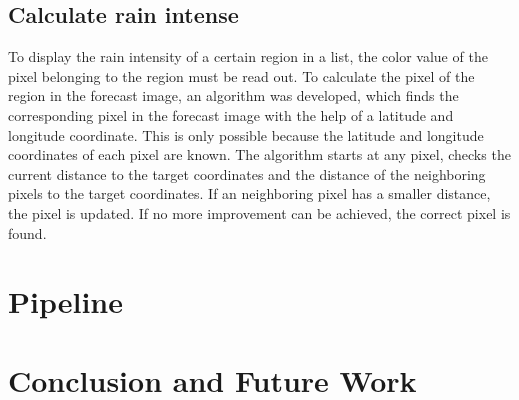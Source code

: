 \documentclass[oneside]{htwg-report}
\begin{document}
\subsection*{Calculate rain intense}
    \begin{sloppypar}
        To display the rain intensity of a certain region in a list, the color value of the pixel belonging to the region must be read out. 
        To calculate the pixel of the region in the forecast image, an algorithm was developed, which finds the corresponding pixel in the forecast image with the help of a latitude and longitude coordinate. 
        This is only possible because the latitude and longitude coordinates of each pixel are known. 
        The algorithm starts at any pixel, checks the current distance to the target coordinates and the distance of the neighboring pixels to the target coordinates. 
        If an neighboring pixel has a smaller distance, the pixel is updated. If no more improvement can be achieved, the correct pixel is found. 
    \end{sloppypar}


\section*{Pipeline}


\section*{Conclusion and Future Work}
\end{document}
